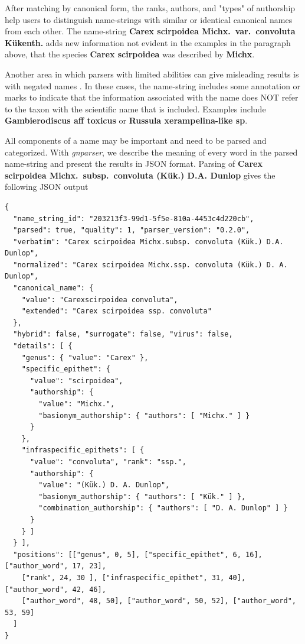 \documentclass{bmcart}
\begin{document}
After matching by canonical form, the ranks, authors, and "types" of authorship
help users to distinguish name-strings with similar or identical canonical
names from each other.  The name-string \textbf{Carex scirpoidea Michx.\ var.\
  convoluta Kükenth.} adds new information not evident in the examples in the
paragraph above, that the species \textbf{Carex scirpoidea} was described by
\textbf{Michx}.

Another area in which parsers with limited abilities can give misleading
results is with negated names \cite{Patterson:inpress-a}. In these cases, the
name-string includes some annotation or marks to indicate that the information
associated with the name does NOT refer to the taxon with the scientific name
that is included. Examples include \textbf{Gambierodiscus aff toxicus} or
\textbf{Russula xerampelina-like sp}.

All components of a name may be important and need to be parsed and
categorized. With \textit{gnparser}, we describe the meaning of every word in
the parsed name-string and present the results in JSON format. Parsing of
\textbf{Carex scirpoidea Michx.\  subsp.\ convoluta (Kük.) D.A. Dunlop} gives
the following JSON output \vspace{0.5cm}

\begin{Verbatim}[fontsize=\scriptsize]
{
  "name_string_id": "203213f3-99d1-5f5e-810a-4453c4d220cb",
  "parsed": true, "quality": 1, "parser_version": "0.2.0",
  "verbatim": "Carex scirpoidea Michx.subsp. convoluta (Kük.) D.A. Dunlop",
  "normalized": "Carex scirpoidea Michx.ssp. convoluta (Kük.) D. A. Dunlop",
  "canonical_name": {
    "value": "Carexscirpoidea convoluta",
    "extended": "Carex scirpoidea ssp. convoluta"
  },
  "hybrid": false, "surrogate": false, "virus": false,
  "details": [ {
    "genus": { "value": "Carex" },
    "specific_epithet": {
      "value": "scirpoidea",
      "authorship": {
        "value": "Michx.",
        "basionym_authorship": { "authors": [ "Michx." ] }
      }
    },
    "infraspecific_epithets": [ {
      "value": "convoluta", "rank": "ssp.",
      "authorship": {
        "value": "(Kük.) D. A. Dunlop",
        "basionym_authorship": { "authors": [ "Kük." ] },
        "combination_authorship": { "authors": [ "D. A. Dunlop" ] }
      }
    } ]
  } ],
  "positions": [["genus", 0, 5], ["specific_epithet", 6, 16], ["author_word", 17, 23],
    ["rank", 24, 30 ], ["infraspecific_epithet", 31, 40], ["author_word", 42, 46],
    ["author_word", 48, 50], ["author_word", 50, 52], ["author_word", 53, 59]
  ]
}
\end{Verbatim}
\end{document}
